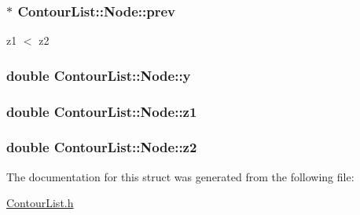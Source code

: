 \subsubsection[{prev}]{$\ast$ Contour\+List\+::\+Node\+::prev}\label{structContourList_1_1Node_af08c22cbddfee4f0c0f6896c7284ed27}


z1 $<$ z2 

\hypertarget{structContourList_1_1Node_ac371d90797c06c6b6a6de40e21d17110}{}
\subsubsection[{y}]{\setlength{\rightskip}{0pt plus 5cm}double Contour\+List\+::\+Node\+::y}\label{structContourList_1_1Node_ac371d90797c06c6b6a6de40e21d17110}
\hypertarget{structContourList_1_1Node_acf3193319486884386610f80a4681014}{}
\subsubsection[{z1}]{\setlength{\rightskip}{0pt plus 5cm}double Contour\+List\+::\+Node\+::z1}\label{structContourList_1_1Node_acf3193319486884386610f80a4681014}
\hypertarget{structContourList_1_1Node_a5274d7d4c01c5205fb6dec2dd0065e11}{}
\subsubsection[{z2}]{\setlength{\rightskip}{0pt plus 5cm}double Contour\+List\+::\+Node\+::z2}\label{structContourList_1_1Node_a5274d7d4c01c5205fb6dec2dd0065e11}


The documentation for this struct was generated from the following file\+:\begin{DoxyCompactItemize}
\item 
\hyperlink{ContourList_8h}{Contour\+List.\+h}\end{DoxyCompactItemize}
